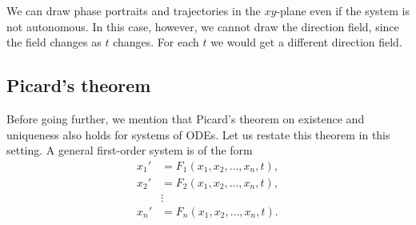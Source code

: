 \begin{myfig}
\parbox[t]{3.0in}{
 \capstart
 \caption{The direction field for $x' = 2y-x$, $y' = x$.%
 \label{sintro-vectorfield:fig}}
}
\quad
\parbox[t]{3.0in}{
 \capstart
 \caption{The direction field for $x' = 2y-x$, $y' = x$ with
 the trajectory of the solution starting at $(1,0)$
 for $0 \leq t \leq 2$.%
 \label{sintro-vectorfield-sol:fig}}
}
\end{myfig}

We can draw phase portraits and trajectories in the $xy$-plane
even if the system is not autonomous.  In this case, however, we cannot draw
the direction field, since the field changes as $t$ changes.  For
each $t$ we would get a different direction field.

\subsection{Picard's theorem}

Before going further, we mention that Picard's theorem on
existence and uniqueness also holds for systems of ODEs.
Let us restate this theorem in this setting.
A general first-order
system is of the form
\begin{equation} \label{eq:general-system}
\begin{aligned}
x_1' & = F_1(x_1,x_2,\ldots,x_n,t) , \\
x_2' & = F_2(x_1,x_2,\ldots,x_n,t) , \\
& \vdots \\
x_n' & = F_n(x_1,x_2,\ldots,x_n,t) .
\end{aligned}
\end{equation}


